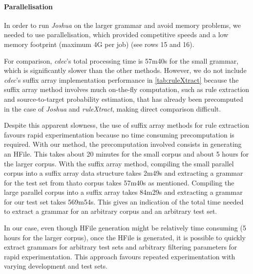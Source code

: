 \paragraph{Parallelisation} In order to run \emph{Joshua} on the larger grammar and
    avoid memory problems, we needed to use parallelisation, which provided
    competitive speeds and a low memory footprint (maximum 4G per job) (see rows
    15 and 16).

For comparison, \emph{cdec}'s total processing time is 57m40s for the small
grammar, which is significantly slower than the other methods. However, we do
not include \emph{cdec}'s suffix array implementation performance in
\autoref{tab:ruleXtract}
because the suffix array method involves much on-the-fly computation, such
as rule extraction and source-to-target probability estimation, that has
already been precomputed in the case of \emph{Joshua} and \emph{ruleXtract},
making direct comparison difficult.

Despite this apparent slowness, the use of suffix array methods for rule extraction
favours rapid experimentation because no time consuming precomputation is required.
With our method, the precomputation involved consists in generating an HFile.
This takes about 20 minutes for the small corpus and about 5 hours for the larger
corpus. With the suffix array method,
compiling the small parallel corpus into a suffix array
data structure takes 2m49s and extracting a grammar for the test set from
thato corpus takes 57m40s as mentioned. Compiling the large parallel corpus
into a suffix array takes 84m29s and extracting a grammar for our test set
takes 569m54s. This gives an indication of the total
time needed to extract a grammar for an arbitrary corpus and an arbitrary test
set.


In our case, even though HFile generation might be relatively
time consuming (5 hours for the larger corpus), once
the HFile is generated, it is possible to quickly extract grammars
for arbitrary test sets and arbitrary filtering parameters for rapid
experimentation. This approach favours repeated experimentation
with varying development and test sets.

